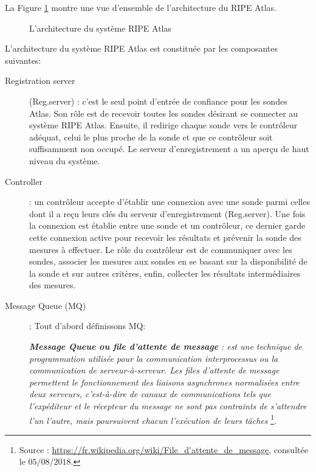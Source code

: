 La Figure  \ref{fig:archi-ripe-atlas} montre une vue d'ensemble de l'architecture du RIPE Atlas.

\begin{figure}[H]
	\centering
	\resizebox{\textwidth}{!}{
		 
	}
	\caption{L'architecture du système  RIPE Atlas  }
	\label{fig:archi-ripe-atlas}
\end{figure}

L'architecture du système  RIPE Atlas est constituée par  les composantes suivantes:
\begin{description}
	\item [Registration server] (Reg.server) : c'est le seul point d'entrée de confiance pour les sondes Atlas. Son rôle est de recevoir toutes les sondes désirant se connecter au système RIPE Atlas. Ensuite, il redirige chaque sonde vers le contrôleur adéquat, celui le plus proche de la sonde et que ce contrôleur  soit suffisamment non occupé.  Le serveur d'enregistrement  a un aperçu de haut niveau du système.
	
	\item [Controller]: un contrôleur accepte d'établir une connexion avec une sonde parmi celles dont il a reçu leurs clés du serveur d'enregistrement (Reg.server). Une fois la connexion est établie entre une sonde et un contrôleur, ce dernier garde cette connexion active pour recevoir les résultats et prévenir la sonde des mesures à effectuer.  Le rôle du contrôleur est de communiquer avec les sondes,  associer les mesures aux sondes en se basant sur la disponibilité de la sonde et sur autres critères, enfin, collecter les résultats intermédiaires des mesures.
	
	\item [Message Queue (MQ)] : Tout d'abord définissons MQ:
	
	\begin{tcolorbox}[title=Message Queue]
		\og    \textbf{\textit{Message Queue ou file d'attente de message}} \textit{:  est une technique de programmation utilisée pour la communication interprocessus ou la communication de serveur-à-serveur. Les files d'attente de message permettent le fonctionnement des liaisons asynchrones normalisées entre deux serveurs, c'est-à-dire de canaux de communications tels que l'expéditeur et le récepteur du message ne sont pas contraints de s'attendre l'un l'autre, mais poursuivent chacun l'exécution de leurs tâches} \footnote{Source : \url{https://fr.wikipedia.org/wiki/File\_d'attente\_de\_message}, consultée le $05/08/2018$.}. \fg{}
	\end{tcolorbox} 
	

\end{description}
